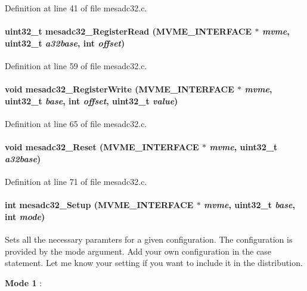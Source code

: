 Definition at line 41 of file mesadc32.c.
\paragraph[{mesadc32\_\-RegisterRead}]{\setlength{\rightskip}{0pt plus 5cm}uint32\_\-t mesadc32\_\-RegisterRead ({\bf MVME\_\-INTERFACE} $\ast$ {\em mvme}, \/  uint32\_\-t {\em a32base}, \/  int {\em offset})}\hfill\label{mesadc32drv_8h_a8c205a689425f1d509ff91a1a515ed98}


Definition at line 59 of file mesadc32.c.
\paragraph[{mesadc32\_\-RegisterWrite}]{\setlength{\rightskip}{0pt plus 5cm}void mesadc32\_\-RegisterWrite ({\bf MVME\_\-INTERFACE} $\ast$ {\em mvme}, \/  uint32\_\-t {\em base}, \/  int {\em offset}, \/  uint32\_\-t {\em value})}\hfill\label{mesadc32drv_8h_a9da90e21c1532568a68ff3637651d0c2}


Definition at line 65 of file mesadc32.c.
\paragraph[{mesadc32\_\-Reset}]{\setlength{\rightskip}{0pt plus 5cm}void mesadc32\_\-Reset ({\bf MVME\_\-INTERFACE} $\ast$ {\em mvme}, \/  uint32\_\-t {\em a32base})}\hfill\label{mesadc32drv_8h_a208144ab05e3d289db466f99181aef72}


Definition at line 71 of file mesadc32.c.
\paragraph[{mesadc32\_\-Setup}]{\setlength{\rightskip}{0pt plus 5cm}int mesadc32\_\-Setup ({\bf MVME\_\-INTERFACE} $\ast$ {\em mvme}, \/  uint32\_\-t {\em base}, \/  int {\em mode})}\hfill\label{mesadc32drv_8h_a95eb66d4984998966acc70b1424f632f}
Sets all the necessary paramters for a given configuration. The configuration is provided by the mode argument. Add your own configuration in the case statement. Let me know your setting if you want to include it in the distribution.
\begin{DoxyItemize}
\item {\bfseries Mode 1} :
\end{DoxyItemize}


